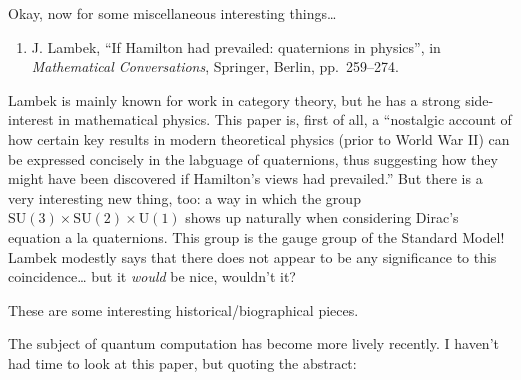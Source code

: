 \documentclass[12pt]{article}
\def\tightlist{}
\renewcommand{\texttt}[1]{%
  \begingroup
  \ttfamily
  \begingroup\lccode`~=`/\lowercase{\endgroup\def~}{/\discretionary{}{}{}}%
  \begingroup\lccode`~=`[\lowercase{\endgroup\def~}{[\discretionary{}{}{}}%
  \begingroup\lccode`~=`.\lowercase{\endgroup\def~}{.\discretionary{}{}{}}%
  \catcode`/=\active\catcode`[=\active\catcode`.=\active
  \scantokens{#1\noexpand}%
  \endgroup
}
\begin{document}
Okay, now for some miscellaneous interesting things\ldots{}

\begin{enumerate}
\def\labelenumi{\arabic{enumi})}
\setcounter{enumi}{10}
\tightlist
\item
  J. Lambek, ``If Hamilton had prevailed: quaternions in physics'', 
in \emph{Mathematical Conversations}, Springer, Berlin, pp.\ 259--274.
\end{enumerate}
\noindent
Lambek is mainly known for work in category theory, but he has a strong
side-interest in mathematical physics. This paper is, first of all, a
``nostalgic account of how certain key results in modern theoretical
physics (prior to World War II) can be expressed concisely in the
labguage of quaternions, thus suggesting how they might have been
discovered if Hamilton's views had prevailed.'' But there is a very
interesting new thing, too: a way in which the group
\(\mathrm{SU}(3) \times \mathrm{SU}(2) \times \mathrm{U}(1)\) shows up
naturally when considering Dirac's equation a la quaternions. This group
is the gauge group of the Standard Model! Lambek modestly says that
there does not appear to be any significance to this coincidence\ldots{}
but it \emph{would} be nice, wouldn't it?


These are some interesting historical/biographical pieces.

\noindent
The subject of quantum computation has become more lively recently. I
haven't had time to look at this paper, but quoting the abstract:
\end{document}
